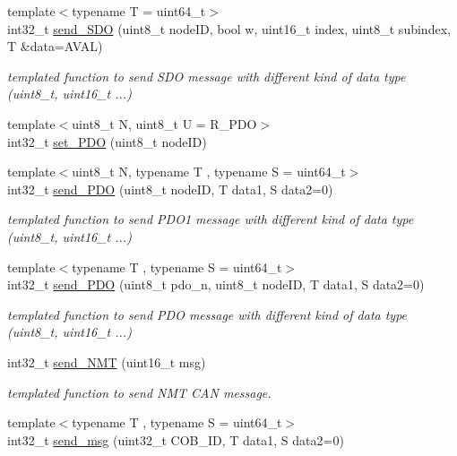\begin{DoxyCompactItemize}
{\footnotesize template$<$typename T  = uint64\+\_\+t$>$ }\\int32\+\_\+t \hyperlink{class_canopen__socket_a24d92b73c10d954c9c7dda3ca16173ef}{send\+\_\+\+S\+DO} (uint8\+\_\+t node\+ID, bool w, uint16\+\_\+t index, uint8\+\_\+t subindex, T \&data=A\+V\+AL)
\begin{DoxyCompactList}\small\item\em templated function to send S\+DO message with different kind of data type (uint8\+\_\+t, uint16\+\_\+t ...) \end{DoxyCompactList}\item 
{\footnotesize template$<$uint8\+\_\+t N, uint8\+\_\+t U = R\+\_\+\+P\+DO$>$ }\\int32\+\_\+t \hyperlink{class_canopen__socket_aa3cb0686ca837db520281613741e5776}{set\+\_\+\+P\+DO} (uint8\+\_\+t node\+ID)
\item 
{\footnotesize template$<$uint8\+\_\+t N, typename T , typename S  = uint64\+\_\+t$>$ }\\int32\+\_\+t \hyperlink{class_canopen__socket_a7450dea468619c57c7a3eda7c69bcafa}{send\+\_\+\+P\+DO} (uint8\+\_\+t node\+ID, T data1, S data2=0)
\begin{DoxyCompactList}\small\item\em templated function to send P\+D\+O1 message with different kind of data type (uint8\+\_\+t, uint16\+\_\+t ...) \end{DoxyCompactList}\item 
{\footnotesize template$<$typename T , typename S  = uint64\+\_\+t$>$ }\\int32\+\_\+t \hyperlink{class_canopen__socket_abfb76ebe139e5c32cf0a5f280aea33d6}{send\+\_\+\+P\+DO} (uint8\+\_\+t pdo\+\_\+n, uint8\+\_\+t node\+ID, T data1, S data2=0)
\begin{DoxyCompactList}\small\item\em templated function to send P\+DO message with different kind of data type (uint8\+\_\+t, uint16\+\_\+t ...) \end{DoxyCompactList}\item 
int32\+\_\+t \hyperlink{class_canopen__socket_a835dea5a2888f8e689e587651e5f4edd}{send\+\_\+\+N\+MT} (uint16\+\_\+t msg)
\begin{DoxyCompactList}\small\item\em templated function to send N\+MT C\+AN message. \end{DoxyCompactList}\item 
{\footnotesize template$<$typename T , typename S  = uint64\+\_\+t$>$ }\\int32\+\_\+t \hyperlink{class_canopen__socket_a52a0dcf2d0f5f7708f73af80fab0d610}{send\+\_\+msg} (uint32\+\_\+t C\+O\+B\+\_\+\+ID, T data1, S data2=0)

\end{DoxyCompactItemize}
